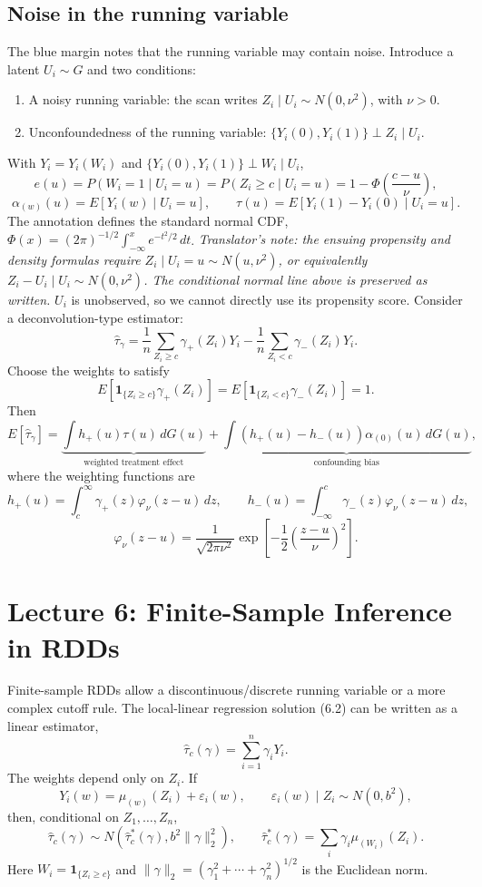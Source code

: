 \subsection{Noise in the running variable}
The blue margin notes that the running variable may contain noise. Introduce a latent $U_i\sim G$ and two conditions:
\begin{enumerate}
\item A noisy running variable: the scan writes $Z_i\mid U_i\sim N(0,\nu^2)$, with $\nu>0$.
\item Unconfoundedness of the running variable: $\{Y_i(0),Y_i(1)\}\perp Z_i\mid U_i$.
\end{enumerate}
With $Y_i=Y_i(W_i)$ and $\{Y_i(0),Y_i(1)\}\perp W_i\mid U_i$,
\[
e(u)=P(W_i=1\mid U_i=u)=P(Z_i\geq c\mid U_i=u)
=1-\Phi\left(\frac{c-u}{\nu}\right),
\]
\[
\alpha_{(w)}(u)=E[Y_i(w)\mid U_i=u],\qquad
\tau(u)=E[Y_i(1)-Y_i(0)\mid U_i=u].
\]
The annotation defines the standard normal CDF,
$\Phi(x)=(2\pi)^{-1/2}\int_{-\infty}^x e^{-t^2/2}\,dt$.
\textit{Translator's note: the ensuing propensity and density formulas require $Z_i\mid U_i=u\sim N(u,\nu^2)$, or equivalently $Z_i-U_i\mid U_i\sim N(0,\nu^2)$. The conditional normal line above is preserved as written.}
$U_i$ is unobserved, so we cannot directly use its propensity score. Consider a deconvolution-type estimator:
\[
\widehat\tau_\gamma=\frac1n\sum_{Z_i\geq c}\gamma_+(Z_i)Y_i
-\frac1n\sum_{Z_i<c}\gamma_-(Z_i)Y_i.
\]
Choose the weights to satisfy
\[
E[\mathbf1_{\{Z_i\geq c\}}\gamma_+(Z_i)]
=E[\mathbf1_{\{Z_i<c\}}\gamma_-(Z_i)]=1.
\]
Then
\[
E[\widehat\tau_\gamma]
=\underbrace{\int h_+(u)\tau(u)\,dG(u)}_{\text{weighted treatment effect}}
+\underbrace{\int(h_+(u)-h_-(u))\alpha_{(0)}(u)\,dG(u)}_{\text{confounding bias}},
\]
where the weighting functions are
\[
h_+(u)=\int_c^\infty\gamma_+(z)\varphi_\nu(z-u)\,dz,\qquad
h_-(u)=\int_{-\infty}^c\gamma_-(z)\varphi_\nu(z-u)\,dz,
\]
\[
\varphi_\nu(z-u)=\frac1{\sqrt{2\pi\nu^2}}\exp\left[-\frac12\left(\frac{z-u}{\nu}\right)^2\right].
\]

\section{Lecture 6: Finite-Sample Inference in RDDs}
Finite-sample RDDs allow a discontinuous/discrete running variable or a more complex cutoff rule. The local-linear regression solution (6.2) can be written as a linear estimator,
\[
\widehat\tau_c(\gamma)=\sum_{i=1}^n\gamma_iY_i.\tag{6.3 in the notes}
\]
The weights depend only on $Z_i$. If
\[
Y_i(w)=\mu_{(w)}(Z_i)+\varepsilon_i(w),\qquad
\varepsilon_i(w)\mid Z_i\sim N(0,b^2),
\]
then, conditional on $Z_1,\ldots,Z_n$,
\[
\widehat\tau_c(\gamma)\sim N(\widehat\tau_c^*(\gamma),b^2\|\gamma\|_2^2),
\qquad \widehat\tau_c^*(\gamma)=\sum_i\gamma_i\mu_{(W_i)}(Z_i).
\]
Here $W_i=\mathbf1_{\{Z_i\geq c\}}$ and $\|\gamma\|_2=(\gamma_1^2+\cdots+\gamma_n^2)^{1/2}$ is the Euclidean norm.
